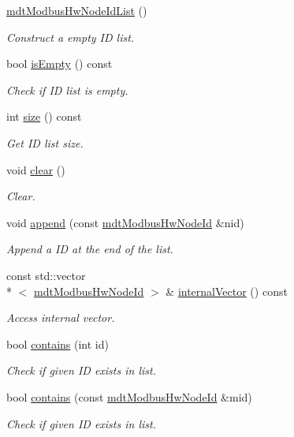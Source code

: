 \begin{DoxyCompactItemize}
\item 
\hyperlink{classmdt_modbus_hw_node_id_list_a43e592ef13ae3287ba487ee5542e9d05}{mdt\-Modbus\-Hw\-Node\-Id\-List} ()
\begin{DoxyCompactList}\small\item\em Construct a empty I\-D list. \end{DoxyCompactList}\item 
bool \hyperlink{classmdt_modbus_hw_node_id_list_aa5d2009d92665981914c13d3f6e2a83b}{is\-Empty} () const 
\begin{DoxyCompactList}\small\item\em Check if I\-D list is empty. \end{DoxyCompactList}\item 
int \hyperlink{classmdt_modbus_hw_node_id_list_a60cee91733c468d12d155b8ad7801123}{size} () const 
\begin{DoxyCompactList}\small\item\em Get I\-D list size. \end{DoxyCompactList}\item 
void \hyperlink{classmdt_modbus_hw_node_id_list_a10b2de57c349693d6c4a26d816d46e5d}{clear} ()
\begin{DoxyCompactList}\small\item\em Clear. \end{DoxyCompactList}\item 
void \hyperlink{classmdt_modbus_hw_node_id_list_ac12f3a0dea39df102ef7733083723904}{append} (const \hyperlink{classmdt_modbus_hw_node_id}{mdt\-Modbus\-Hw\-Node\-Id} \&nid)
\begin{DoxyCompactList}\small\item\em Append a I\-D at the end of the list. \end{DoxyCompactList}\item 
const std\-::vector\\*
$<$ \hyperlink{classmdt_modbus_hw_node_id}{mdt\-Modbus\-Hw\-Node\-Id} $>$ \& \hyperlink{classmdt_modbus_hw_node_id_list_a701d52dd057ee2bbc8d90e3273be622c}{internal\-Vector} () const 
\begin{DoxyCompactList}\small\item\em Access internal vector. \end{DoxyCompactList}\item 
bool \hyperlink{classmdt_modbus_hw_node_id_list_a66cd715b758e4b84e3d3c788a90cdf31}{contains} (int id)
\begin{DoxyCompactList}\small\item\em Check if given I\-D exists in list. \end{DoxyCompactList}\item 
bool \hyperlink{classmdt_modbus_hw_node_id_list_a7766ea718f4f716a38cd5853906ecb78}{contains} (const \hyperlink{classmdt_modbus_hw_node_id}{mdt\-Modbus\-Hw\-Node\-Id} \&mid)
\begin{DoxyCompactList}\small\item\em Check if given I\-D exists in list. \end{DoxyCompactList}\end{DoxyCompactItemize}


